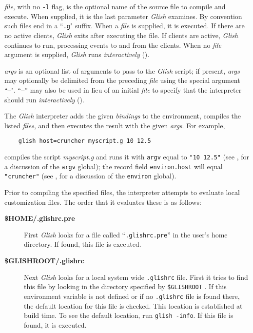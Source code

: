 \begin{sloppy}
{\em file}, with no {\tt-l} flag, is the optional name of the source file
to compile and execute. When supplied, it is the last parameter {\em Glish}
examines. By convention such files end in a ``{\tt .g}" suffix.  When a {\em file}
is supplied, it is executed. If there are no active clients, {\em Glish}
exits after executing the file. If clients are active, {\em Glish} continues
to run, processing events to and from the clients. When no {\em file} argument
is supplied, {\em Glish} runs {\em interactively} ().

{\em args} is an optional list of arguments to pass to the {\em Glish}
script; if present, {\em args} may optionally
be delimited from the preceding
{\em file} using the special argument ``{\tt --}".  ``{\tt --}'' may also
be used in lieu of an initial {\em file} to specify that the interpreter
should run {\em interactively} ().

The {\em Glish} interpreter adds the given {\em bindings} to the environment,
compiles the listed {\em files}, and then executes the result with
the given {\em args\/}.  For example,
\begin{verbatim}
    glish host=cruncher myscript.g 10 12.5
\end{verbatim}
compiles the script {\em myscript.g} and runs it with {\tt argv}
equal to {\tt "10 12.5"} (see , for a discussion of
the {\tt argv} global); the record field {\tt environ.host} will equal
{\tt "cruncher"} (see , for a discussion of the
{\tt environ} global).

Prior to compiling the specified files, the interpreter attempts to
\label{glishrc}
evaluate local customization files. The order that it evaluates these
is as follows:

\begin{description}

\item[{\bf \$HOME/.glishrc.pre}]
First {\em Glish} looks for a file called ``{\tt.glishrc.pre}'' in the
user's home directory. If found, this file is executed.

\item[{\bf \$GLISHROOT/.glishrc}]
Next {\em Glish} looks for a local system
wide {\tt .glishrc} file. First it tries to find this file by looking
in the directory specified by {\tt \$GLISHROOT}
.
If this environment variable is not defined or if no {\tt .glishrc} file
is found there, the default location for this file is checked. This location
is established at build time. To see the default location, run \verb+glish -info+.
If this file is found, it is executed.


\end{description}
\end{sloppy}

